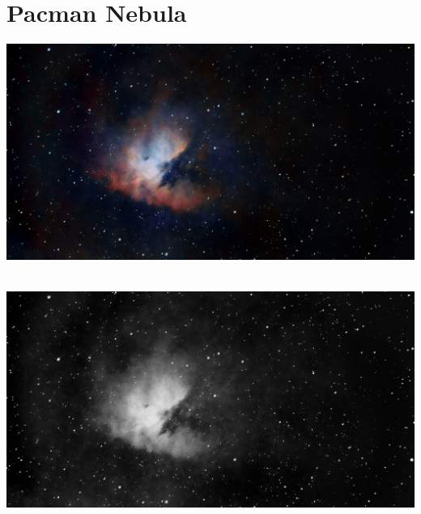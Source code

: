 \ \\\section{Pacman Nebula}
\includegraphics[width=\textwidth]{../Imaging//Original/Pacman_Nebula.jpg}
{\footnotesize\color{white}


}\ \\
\includegraphics[width=\textwidth]{../Imaging//Grayscale/Pacman_Nebula.jpg}
